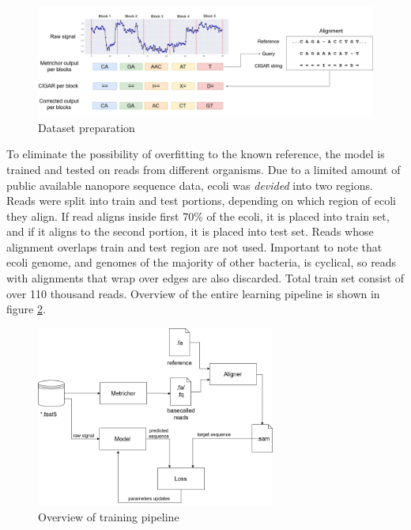 \documentclass[times, utf8, diplomski, numeric, english]{fer}
\begin{document}
\begin{figure}[!ht]
	\begin{center}
		\includegraphics[width=1\textwidth]{./imgs/train_data_correction.png}
		\caption{Dataset preparation}
		\label{fg:data_correction}
	\end{center}
\end{figure}


To eliminate the possibility of overfitting to the known reference, the model is trained and tested on reads from different organisms. Due to a limited amount of public available nanopore sequence data, ecoli was \textit{devided} into two regions.
Reads were split into train and test portions, depending on which region of ecoli they align. 
If read aligns inside first 70\% of the ecoli, it is placed into train set, and if it aligns to the second portion, it is placed into test set. Reads whose alignment overlaps train and test region are not used. Important to note that ecoli genome, and genomes of the majority of other bacteria, is cyclical, so reads with alignments that wrap over edges are also discarded. Total train set consist of over 110 thousand reads.
Overview of the entire learning pipeline is shown in figure \ref{fg:train_pipe}.
\begin{figure}[!ht]
	\begin{center}
		\includegraphics[width=0.7\textwidth]{./imgs/train_pipeline.png}
		\caption{Overview of training pipeline}
		\label{fg:train_pipe}
	\end{center}
\end{figure}
\end{document}
